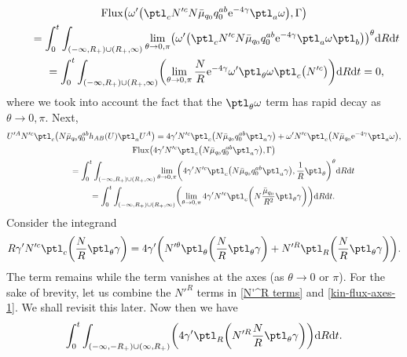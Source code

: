 \begin{gather*}
{\rm Flux} \bigl(\omega' \bigl(\ptl_c N'^c N \bar{\mu}_{q_0} q^{ab} _0 {\rm e}^{-4 \gamma} \ptl_a \omega\bigr), \Gamma\bigr) \notag\\
\qquad{}= \int^t_0 \int_{ (-\infty, R_+) \cup (R_+, \infty) } \lim_{\theta \to 0, \pi} \bigl(\omega' \bigl(\ptl_c N'^c N \bar{\mu}_{q_0} q^{ab} _0 {\rm e}^{-4\gamma} \ptl_a \omega \ptl_b\bigr) \bigr)^\theta {\rm d}R {\rm d}t \notag\\
\qquad{}{}= \int^t_0 \int_{ (-\infty, R_+) \cup (R_+, \infty) } \biggl(\lim_{\theta \to 0, \pi} \frac{N}{R} {\rm e}^{-4\gamma} \omega' \ptl_\theta \omega \ptl_c \bigl(N'^c\bigr) \biggr) {\rm d}R {\rm d}t
=0,
\end{gather*}
where we took into account the fact that the $\ptl_\theta \omega$ term has rapid decay as $\theta \to 0, \pi$.
Next,
\begin{gather*}
U'^A N'^c \ptl_c \bigl(N \bar{\mu}_{q_0} q^{ab}_0 h_{AB} (U) \ptl_a U^A\bigr) = 4\gamma' N'^c\ptl_c \bigl(N \bar{\mu}_{q_0} q^{ab}_0 \ptl_a \gamma\bigr)
+ \omega' N'^c \ptl_c \bigl(N \bar{\mu}_{q_0} {\rm e}^{-4\gamma} \ptl_a \omega\bigr),
\\
{\rm Flux} \bigl(4\gamma' N'^c\ptl_c \bigl(N \bar{\mu}_{q_0} q^{ab}_0 \ptl_a \gamma\bigr), \Gamma\bigr) \notag\\
\qquad{}= \int^t_0 \int_{ (-\infty, R_+) \cup (R_+, \infty) } \lim_{\theta \to 0, \pi} \biggl(
 4\gamma' N'^c\ptl_c \bigl(N \bar{\mu}_{q_0} q^{ab}_0 \ptl_a \gamma\bigr), \frac{1}{R} \ptl_\theta \biggr)^\theta {\rm d}R {\rm d}t \\
\qquad{}= \int^t_0 \int_{ (-\infty, R_+) \cup (R_+, \infty) } \biggl(\lim_{\theta \to 0, \pi} 4 \gamma' N'^c \ptl_c \biggl(N\frac{\bar{\mu}_{q_0}}{R^2} \ptl_\theta \gamma\biggr) \biggr) {\rm d}R {\rm d}t.
\end{gather*}
Consider the integrand
\begin{align} \label{N'^R terms}
 R\gamma' N'^c \ptl_c \biggl(\frac{N}{R} \ptl_\theta \gamma\biggr) = 4 \gamma' \biggl(N'^ \theta \ptl_\theta \biggl(\frac{N}{R} \ptl_\theta \gamma\biggr) + N'^R \ptl_R \biggl(\frac{N}{R} \ptl_\theta \gamma\biggr) \biggr).
\end{align}
The  term remains while the  term vanishes at the axes (as $\theta \to 0$ or $\pi$). For the sake of brevity, let us combine the $N'^R$ terms in \eqref{N'^R terms} and \eqref{kin-flux-axes-1}. We shall revisit this later. Now then we have
\begin{align} \label{kin-flux-comb-nu'}
\int^t_0 \int_{ (-\infty,-R_+) \cup (\infty, R_+)} \biggl(4 \gamma' \ptl_R \biggl(N'^R \frac{N}{R} \ptl_\theta \gamma\biggr) \biggr) {\rm d}R {\rm d}t.
\end{align}
